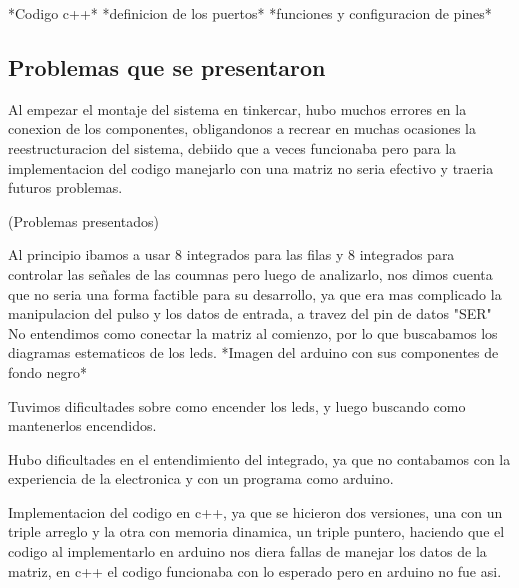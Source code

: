 \documentclass{article}
\begin{document}
*Codigo c++*
*definicion de los puertos*
*funciones y configuracion de pines*

 \vspace{1cm}
 


 \vspace{1cm}
 


 \vspace{1cm}
 


 \vspace{1cm}



\subsection{Problemas que se presentaron}

Al empezar el montaje del sistema en tinkercar, hubo muchos errores en la conexion de los componentes, obligandonos a recrear en muchas ocasiones la reestructuracion del sistema, debiido que a veces funcionaba pero para la implementacion del codigo manejarlo con una matriz no seria efectivo y traeria futuros problemas.
 \vspace{1cm}
 
 (Problemas presentados)
  \vspace{1cm}
 
 Al principio ibamos a usar 8 integrados para las filas y 8 integrados para controlar las señales de las coumnas pero luego de analizarlo, nos dimos cuenta que no seria una forma factible para su desarrollo, ya que era mas complicado la manipulacion del pulso y los datos de entrada, a travez del pin de datos "SER"
No entendimos como conectar la matriz al comienzo, por lo que buscabamos los diagramas estematicos de los leds. 
 \vspace{1cm}
*Imagen del arduino con sus componentes de fondo negro*
 \vspace{1cm}

Tuvimos dificultades sobre como encender los leds, y luego buscando como mantenerlos encendidos.
 \vspace{1cm}

Hubo dificultades en el entendimiento del integrado, ya que no contabamos con la experiencia de la electronica y con un programa como arduino.
 \vspace{1cm}

Implementacion del codigo en c++, ya que se hicieron dos versiones, una con un triple arreglo y la otra con memoria dinamica, un triple puntero, haciendo que el codigo al implementarlo en arduino nos diera fallas de manejar los datos de la matriz, en c++ el codigo funcionaba con lo esperado pero en arduino no fue asi.
\end{document}
